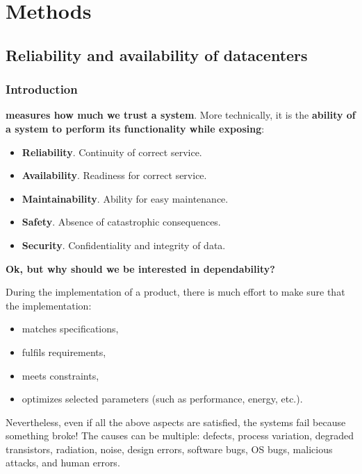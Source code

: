 \section{Methods}

\subsection{Reliability and availability of datacenters}

\subsubsection{Introduction}\label{subsubsection: introduction - dependability}

 \textbf{measures how much we trust a system}. More technically, it is the \textbf{ability of a system to perform its functionality while exposing}:
\begin{itemize}
    \item \textbf{Reliability}. Continuity of correct service.
    \item \textbf{Availability}. Readiness for correct service.
    \item \textbf{Maintainability}. Ability for easy maintenance.
    \item \textbf{Safety}. Absence of catastrophic consequences.
    \item \textbf{Security}. Confidentiality and integrity of data.
\end{itemize}

\highspace
\begin{flushleft}
    \textcolor{Green3}{ \textbf{Ok, but why should we be interested in dependability?}}
\end{flushleft}
During the implementation of a product, there is much effort to make sure that the implementation:
\begin{itemize}
    \item matches specifications,
    \item fulfils requirements,
    \item meets constraints,
    \item optimizes selected parameters (such as performance, energy, etc.).
\end{itemize}
Nevertheless, even if all the above aspects are satisfied, the systems fail because something broke! The causes can be multiple: defects, process variation, degraded transistors, radiation, noise, design errors, software bugs, OS bugs, malicious attacks, and human errors.

